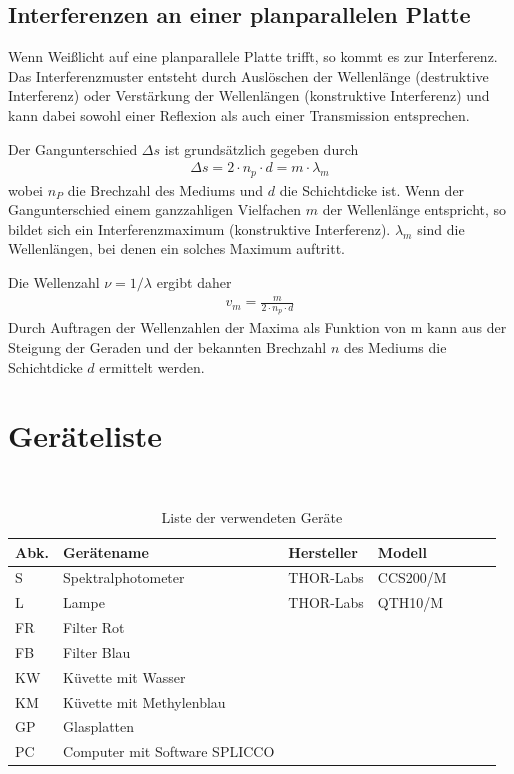 \documentclass{article}
\begin{document}
\subsection{Interferenzen an einer planparallelen Platte}


Wenn Weißlicht auf eine planparallele Platte trifft, so kommt es zur Interferenz. Das Interferenzmuster entsteht durch Auslöschen der Wellenlänge (destruktive Interferenz) oder Verstärkung der Wellenlängen (konstruktive Interferenz) und kann dabei sowohl einer Reflexion als auch einer Transmission entsprechen.

Der Gangunterschied $\Delta s$ ist grundsätzlich gegeben durch
\begin{align}
\Delta s  = 2\cdot n_p\cdot d = m\cdot\lambda_m
\end{align}
wobei $n_P$ die Brechzahl des Mediums und $d$ die Schichtdicke ist. Wenn der Gangunterschied einem ganzzahligen Vielfachen $m$ der Wellenlänge entspricht, so bildet sich ein Interferenzmaximum (konstruktive Interferenz). $\lambda_m$ sind die Wellenlängen, bei denen ein solches Maximum auftritt.

Die Wellenzahl $\nu = 1/\lambda$ ergibt daher
\begin{align}
v_m = \frac{m}{2\cdot n_p\cdot d}
\end{align}
Durch Auftragen der Wellenzahlen der Maxima als Funktion von m kann aus der Steigung der Geraden und der bekannten Brechzahl $n$ des Mediums die Schichtdicke $d$ ermittelt werden.





\section{Geräteliste}

\begin{table}[H]
\caption{Liste der verwendeten Geräte}

~

\begin{tabular}{l|p{3cm}p{3.5cm}llll}
Abk. & Gerätename    & Hersteller & Modell  \\
\hline
S & Spektralphotometer & THOR-Labs & CCS200/M \\
L & Lampe & THOR-Labs & QTH10/M \\
FR & Filter Rot & \\
FB & Filter Blau & \\
KW & Küvette mit Wasser &\\
KM & Küvette mit Methylenblau \\
GP & Glasplatten \\
PC & Computer mit Software SPLICCO
\end{tabular}
\end{table}
\end{document}

